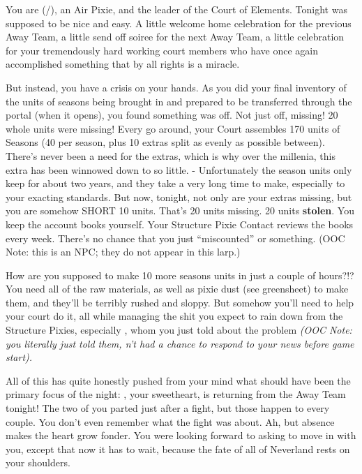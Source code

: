 \documentclass[char]{PP}
\begin{document}
\name{\cEHead{}}

You are \cEHead{} (\cEHead{\They}/\cEHead{\Them}), an Air Pixie, and the leader of the Court of Elements. Tonight was supposed to be nice and easy. A little welcome home celebration for the previous Away Team, a little send off soiree for the next Away Team, a little celebration for your tremendously hard working court members who have once again accomplished something that by all rights is a miracle.

But instead, you have a crisis on your hands. As you did your final inventory of the units of seasons being brought in and prepared to be transferred through the portal (when it opens), you found something was off. Not just off, missing! 20 whole units were missing! Every go around, your Court assembles 170 units of Seasons (40 per season, plus 10 extras split as evenly as possible between). There's never been a need for the extras, which is why over the millenia, this extra has been winnowed down to so little. - Unfortunately the season units only keep for about two years, and they take a very long time to make, especially to your exacting standards. But now, tonight, not only are your extras missing, but you are somehow SHORT 10 units. That's 20 units missing. 20 units \textbf{stolen}. You keep the account books yourself. Your Structure Pixie Contact reviews the books every week. There's no chance that you just “miscounted” or something. (OOC Note: this is an NPC; they do not appear in this larp.)

How are you supposed to make 10 more seasons units in just a couple of hours?!? You need all of the raw materials, as well as pixie dust (see greensheet) to make them, and they'll be terribly rushed and sloppy. But somehow you'll need to help your court do it, all while managing the shit you expect to rain down from the Structure Pixies, especially \cSHead{}, whom you just told about the problem \textit{(OOC Note: you literally just told them, \cSHead{\they} \cSHead{\have}n't had a chance to respond to your news before game start).}

All of this has quite honestly pushed from your mind what should have been the primary focus of the night: \cELove{}, your sweetheart, is returning from the Away Team tonight! The two of you parted just after a fight, but those happen to every couple. You don't even remember what the fight was about. Ah, but absence makes the heart grow fonder. You were looking forward to asking  \cELove{} to move in with you, except that now it has to wait, because the fate of all of Neverland rests on your shoulders.
\end{document}
